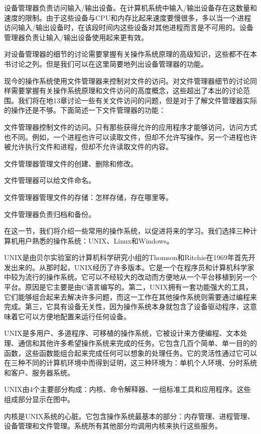 设备管理器负责访问输入/输出设备。在计算机系统中输入/输出设备存在这数量和速度的限制。由于这些设备与CPU和内存比起来速度要慢很多，多以当一个进程访问输入/输出设备时，在该段时间内这些设备对其他进程而言是不可用的。设备管理器负责让输入/输出设备使用起来更有效。

对设备管理器的细节的讨论需要掌握有关操作系统原理的高级知识，这些都不在本书讨论之列。但是我们可以在这里简要地列出设备管理器的功能。

现今的操作系统使用文件管理器来控制对文件的访问。对文件管理器细节的讨论同样需要掌握有关操作系统原理和文件访问的高度概念，这些超出了本出的讨论范围。我们将在地13章讨论一些有关文件访问的问题，但是对于了解文件管理器实际的操作还是不够。下面简述一下文件管理器的功能：

文件管理器控制文件的访问。只有那些获得允许的应用程序才能够访问，访问方式也不同。例如，一个进程也许可以读取文件，但却不允许写操作。另一个进程也许被允许执行文件和进程，但却不允许读取文件的内容。

文件管理器管理文件的创建、删除和修改。

文件管理器可以给文件命名。

文件管理器管理文件的存储：怎样存储，存在哪里等。

文件管理器负责归档和备份。

在这一节，我们将介绍一些常用的操作系统，以促进将来的学习。我们选择三种计算机用户熟悉的操作系统：UNIX、Linux和Windows。

UNIX是由贝尔实验室的计算机科学研究小组的Thomson和Ritchie在1969年首先开发出来的。从那时起，UNIX经历了许多版本。它是一个在程序员和计算机科学家中较为流行的操作系统。它可以不经较大的改动而方便地从一个平台移植到另一个平台。原因是它主要是由C语言编写的。第二，UNIX拥有一套功能强大的工具，它们能够组合起来去解决许多问题，而这一工作在其他操作系统则需要通过编程来完成。第三，它具有设备无关性，因为操作系统本身就包含了设备驱动程序，这意味着它可以方便地配置来运行任何设备。

UNIX是多用户、多道程序、可移植的操作系统，它被设计来方便编程、文本处理、通信和其他许多希望操作系统来完成的任务。它包含几百个简单、单一目的的函数，这些函数能组合起来完成任何可以想象的处理任务。它的灵活性通过它可以在三种不同的计算机环境中而得到证明，这三种环境为：单机个人环境、分时系统和客户、服务器系统。

UNIX由4个主要部分构成：内核、命令解释器、一组标准工具和应用程序。这些组成部分显示在图中。

内核是UNIX系统的心脏。它包含操作系统最基本的部分：内存管理、进程管理、设备管理和文件管理。系统所有其他部分均调用内核来执行这些服务。


